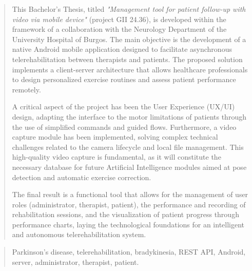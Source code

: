 \documentclass[a4paper,12pt,twoside]{memoir}
\begin{document}
\renewcommand*\abstractname{Abstract}
\begin{abstract}
This Bachelor's Thesis, titled \textit{"Management tool for patient follow-up with video via mobile device"} (project GII 24.36), is developed within the framework of a collaboration with the Neurology Department of the University Hospital of Burgos. The main objective is the development of a native Android mobile application designed to facilitate asynchronous telerehabilitation between therapists and patients. The proposed solution implements a client-server architecture that allows healthcare professionals to design personalized exercise routines and assess patient performance remotely.

A critical aspect of the project has been the User Experience (UX/UI) design, adapting the interface to the motor limitations of patients through the use of simplified commands and guided flows. Furthermore, a video capture module has been implemented, solving complex technical challenges related to the camera lifecycle and local file management. This high-quality video capture is fundamental, as it will constitute the necessary database for future Artificial Intelligence modules aimed at pose detection and automatic exercise correction.

The final result is a functional tool that allows for the management of user roles (administrator, therapist, patient), the performance and recording of rehabilitation sessions, and the visualization of patient progress through performance charts, laying the technological foundations for an intelligent and autonomous telerehabilitation system.
\end{abstract}

\renewcommand*\abstractname{Keywords}
\begin{abstract}
Parkinson's disease, telerehabilitation, bradykinesia, REST API, Android, server, administrator, therapist, patient.
\end{abstract}
\clearpage

\tableofcontents

\clearpage


\mainmatter









\end{document}
